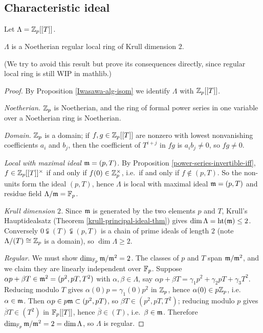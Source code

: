 \subsection{Characteristic ideal}

Let $\Lambda={\mathbb {Z}}_p[[T]]$.

\begin{prop}
\label{Lambda-is-reg-of-dim-2}
$\Lambda$ is a
Noetherian regular local ring of Krull dimension $2$.

(We try to avoid this result but prove its consequences directly,
since regular local ring is still WIP in mathlib.)
\end{prop}

\begin{proof}
By Proposition \ref{Iwasawa-alg-isom} we identify $\Lambda$ with ${\mathbb {Z}}_p[[T]]$.

\emph{Noetherian.} ${\mathbb {Z}}_p$ is Noetherian, and the ring of formal power series in
one variable over a Noetherian ring is Noetherian.

\emph{Domain.} ${\mathbb {Z}}_p$ is a domain; if $f,g\in{\mathbb {Z}}_p[[T]]$ are nonzero with lowest
nonvanishing coefficients $a_i$ and $b_j$, then the coefficient of $T^{i+j}$ in
$fg$ is $a_ib_j\neq 0$, so $fg\neq 0$.

\emph{Local with maximal ideal ${\mathfrak{m}}=(p,T)$.}
By Proposition \ref{power-series-invertible-iff}, $f\in{\mathbb {Z}}_p[[T]]^\times$ if and
only if $f(0)\in{\mathbb {Z}}_p^\times$, i.e.~if and only if $f\notin(p,T)$.
So the non-units form the ideal $(p,T)$, hence $\Lambda$ is local with maximal
ideal ${\mathfrak{m}}=(p,T)$ and residue field $\Lambda/{\mathfrak{m}}={\mathbb {F}}_p$.

\emph{Krull dimension $2$.}
Since ${\mathfrak{m}}$ is generated by the two elements $p$ and $T$, Krull's Hauptidealsatz
(Theorem \ref{krull-principal-ideal-thm}) gives
$\dim\Lambda={\mathrm{ht}}({\mathfrak{m}})\leq 2$.
Conversely $0\subsetneqq(T)\subsetneqq(p,T)$ is a chain of prime ideals of length
$2$ (note $\Lambda/(T)\cong{\mathbb {Z}}_p$ is a domain), so $\dim\Lambda\geq 2$.

\emph{Regular.}
We must show $\dim_{{\mathbb {F}}_p}{\mathfrak{m}}/{\mathfrak{m}}^2=2$.
The classes of $p$ and $T$ span ${\mathfrak{m}}/{\mathfrak{m}}^2$, and we claim they are linearly
independent over ${\mathbb {F}}_p$. Suppose $\alpha p+\beta T\in{\mathfrak{m}}^2=(p^2,pT,T^2)$ with
$\alpha,\beta\in\Lambda$, say
$\alpha p+\beta T=\gamma_1p^2+\gamma_2pT+\gamma_3T^2$.
Reducing modulo $T$ gives $\alpha(0)p=\gamma_1(0)p^2$ in ${\mathbb {Z}}_p$, hence
$\alpha(0)\in p{\mathbb {Z}}_p$, i.e.~$\alpha\in{\mathfrak{m}}$.
Then $\alpha p\in p{\mathfrak{m}}\subset(p^2,pT)$, so $\beta T\in(p^2,pT,T^2)$; reducing
modulo $p$ gives $\overline\beta T\in(T^2)$ in ${\mathbb {F}}_p[[T]]$, hence
$\overline\beta\in(T)$, i.e.~$\beta\in{\mathfrak{m}}$.
Therefore $\dim_{{\mathbb {F}}_p}{\mathfrak{m}}/{\mathfrak{m}}^2=2=\dim\Lambda$, so $\Lambda$ is regular.
\end{proof}

